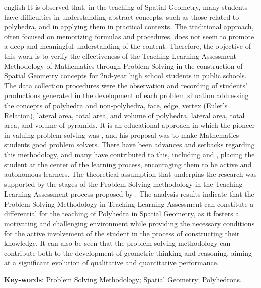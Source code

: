 
\begin{resumo}[Abstract]
	\begin{otherlanguage*}{english}
		It is observed that, in the teaching of Spatial Geometry, many students have difficulties in understanding abstract concepts, such as those related to polyhedra, and in applying them in practical contexts. The traditional approach, often focused on memorizing formulas and procedures, does not seem to promote a deep and meaningful understanding of the content. Therefore, the objective of this work is to verify the effectiveness of the Teaching-Learning-Assessment Methodology of Mathematics through Problem Solving in the construction of Spatial Geometry concepts for 2nd-year high school students in public schools. The data collection procedures were the observation and recording of students' productions generated in the development of each problem situation addressing the concepts of polyhedra and non-polyhedra, face, edge, vertex (Euler's Relation), lateral area, total area, and volume of polyhedra, lateral area, total area, and volume of pyramids. It is an educational approach in which the pioneer in valuing problem-solving was , and his proposal was to make Mathematics students good problem solvers. There have been advances and setbacks regarding this methodology, and many have contributed to this, including  and , placing the student at the center of the learning process, encouraging them to be active and autonomous learners. The theoretical assumption that underpins the research was supported by the stages of the Problem Solving methodology in the Teaching-Learning-Assessment process proposed by . The analysis results indicate that the Problem Solving Methodology in Teaching-Learning-Assessment can constitute a differential for the teaching of Polyhedra in Spatial Geometry, as it fosters a motivating and challenging environment while providing the necessary conditions for the active involvement of the student in the process of constructing their knowledge. It can also be seen that the problem-solving methodology can contribute both to the development of geometric thinking and reasoning, aiming at a significant evolution of qualitative and quantitative performance.

		\vspace{\onelineskip}

		\noindent
		\textbf{Key-words}: Problem Solving Methodology; Spatial Geometry; Polyhedrons.
	\end{otherlanguage*}
\end{resumo}
